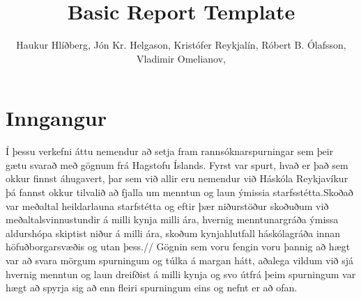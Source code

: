 \documentclass[12pt, svn, draft]{rureport}
\author{Haukur Hlíðberg, Jón Kr. Helgason, Kristófer Reykjalín, Róbert B. Ólafsson, Vladimir Omelianov,}  %
\title{Basic Report Template}  %
\begin{document}
\maketitle  %



\section{Inngangur} %

Í þessu verkefni áttu nemendur að setja fram rannsóknarspurningar sem þeir gætu svarað með gögnum frá Hagstofu Íslands. Fyrst var spurt, hvað er það sem okkur finnst áhugavert, þar sem við allir eru nemendur við Háskóla Reykjavíkur þá fannst okkur tilvalið að fjalla um  menntun og laun ýmissia starfsstétta.Skoðað var meðaltal heildarlauna starfstétta og eftir þær niðurstöður skoðuðum við meðaltalsvinnustundir á milli kynja milli ára,  hvernig menntunargráða ýmissa aldurshópa skiptist niður á milli ára, skoðum kynjahlutfall háskólagráða innan höfuðborgarsvæðis og utan þess.//
Gögnin sem voru fengin voru þannig að hægt var að svara mörgum spurningum og túlka á margan hátt, aðalega vildum við sjá hvernig menntun og laun dreifðist á milli kynja og svo útfrá þeim spurningum var hægt að spyrja sig að enn fleiri spurningum eins og nefnt er að ofan.



\end{document}
